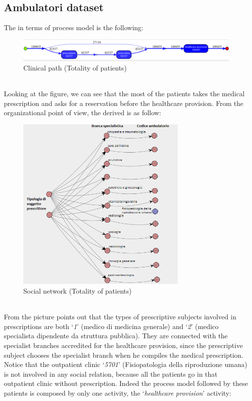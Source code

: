 \subsection{Ambulatori dataset} \label{analysis:1}
The  in terms of process model is the following:
\begin{figure}[htbp]
\includegraphics[width=\textwidth, keepaspectratio]{AmbulatoriInductiveVisualMiner}
\caption{Clinical path (Totality of patients)}
\end{figure}\\
Looking at the figure, we can see that the most of the patients takes the medical prescription and asks for a reservation before the healthcare provision. From the organizational point of view, the  derived is as follow:
\begin{figure}[htbp]
\includegraphics[width=0.75\textwidth, keepaspectratio]{AmbulatoriSocialNetwork}
\caption{Social network (Totality of patients)}
\end{figure}\\
From the picture points out that the types of prescriptive subjects involved in prescriptions are both `\textit{1}' (medico di medicina generale) and `\textit{2}' (medico specialista dipendente da struttura pubblica). They are connected with the specialist branches accredited for the healthcare provision, since the prescriptive subject chooses the specialist branch when he compiles the medical prescription. Notice that the outpatient clinic `\textit{5701}' (Fisiopatologia della riproduzione umana) is not involved in any social relation, because all the patients go in that outpatient clinic without prescription. Indeed the process model followed by these patients is composed by only one activity, the `\textit{healthcare provision}' activity:
